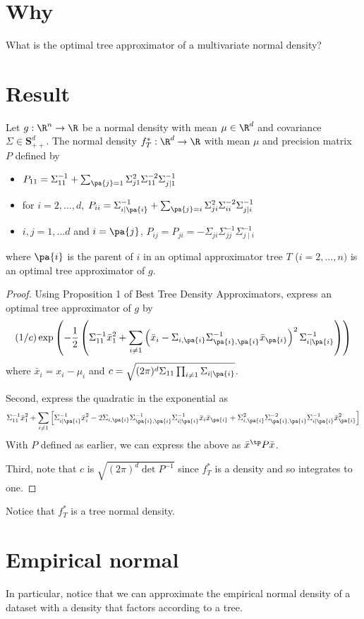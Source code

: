 
\section*{Why}

What is the optimal tree approximator of a multivariate normal density?

\section*{Result}



\begin{proposition}
Let $g: \R ^n \to \R $ be a normal density with mean $\mu \in \R ^d$ and covariance $\Sigma  \in \mathbf{S} ^d_{++}$.
The normal density $f^*_T: \R ^d \to \R $ with mean $\mu $ and precision matrix $P$ defined by
    \begin{itemize}
      \item $P_{11} = \Sigma _{11}^{-1} + \sum_{\pa{j} = 1} \Sigma _{j1}^2\Sigma _{11}^{-2}\Sigma _{j\mid 1}^{-1}$
      \item for $i = 2, \dots , d$, $P_{ii} = \Sigma _{i\mid\pa{i}}^{-1} + \sum_{\pa{j} = i} \Sigma _{ji}^2\Sigma _{ii}^{-2}\Sigma _{j\mid i}^{-1}$
      \item $i, j = 1, \dots  d$ and $i = \pa{j}$, $P_{ij} = P_{ji} = -\Sigma _{ji}\Sigma _{jj}^{-1}\Sigma _{j \mid i}^{-1}$
    \end{itemize}
where $\pa{i}$ is the parent of $i$ in an optimal approximator tree $T$ ($i = 2, \dots , n)$ is an optimal tree approximator of $g$.

\end{proposition}

\begin{proof}Using Proposition 1 of Best Tree Density Approximators, express an optimal tree approximator of $g$ by
\[
(1/c)
\exp\left(
-\frac{1}{2}
\left(
\Sigma _{11}^{-1}\bar{x}_1^2 +
\sum_{i \neq 1}
\left(\bar{x}_i - \Sigma _{i,\pa{i}}\Sigma _{\pa{i},\pa{i}}^{-1}\bar{x}_{\pa{i}}\right)^2\Sigma _{i\mid\pa{i}}^{-1}
\right)
\right)
\]
where $\bar{x}_i = x_i - \mu _i$ and $c = \sqrt{(2\pi )^d\Sigma _{11} \prod_{i \neq 1} \Sigma _{i \mid \pa{i}}}$.

Second, express the quadratic in the exponential as
\[
\Sigma _{11}^{-1}\bar{x}_1^2 +
\sum_{i \neq 1}
\left[
\Sigma _{i\mid\pa{i}}^{-1}
\bar{x}_i^2
-
2
\Sigma _{i,\pa{i}}\Sigma _{\pa{i},\pa{i}}^{-1}\Sigma _{i\mid\pa{i}}^{-1}
\bar{x}_i\bar{x}_{\pa{i}}
+
\Sigma _{i,\pa{i}}^2\Sigma _{\pa{i},\pa{i}}^{-2}\Sigma _{i\mid\pa{i}}^{-1}
\bar{x}_{\pa{i}}^2
\right]
\]
With $P$ defined as earlier, we can express the above as $\bar{x}^{\tp} P \bar{x}$.



Third, note that $c$ is $\sqrt{(2\pi )^d\det P^{-1}}$ since $f^*_T$ is a density and so integrates to one.
\end{proof}
Notice that $f^*_T$ is a tree normal density.

\section*{Empirical normal}

In particular, notice that we can approximate the empirical normal density of a dataset with a density that factors according to a tree.
